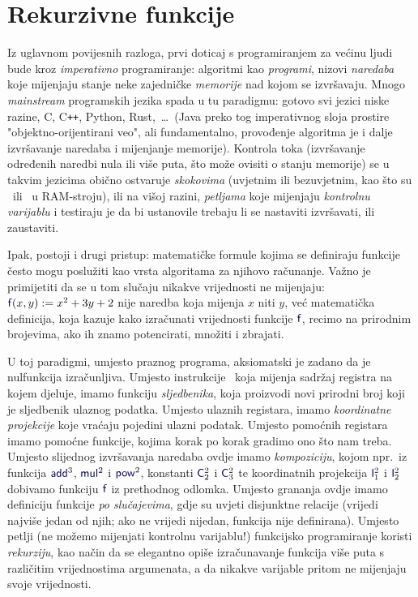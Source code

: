 \chapter{Rekurzivne funkcije}\label{ch:rek}

Iz uglavnom povijesnih razloga, prvi doticaj s programiranjem za većinu ljudi bude kroz \emph{imperativno} programiranje: algoritmi kao \emph{programi}, nizovi \emph{naredaba} koje mijenjaju stanje neke zajedničke \emph{memorije} nad kojom se izvršavaju. Mnogo \emph{mainstream} programskih jezika spada u tu paradigmu: gotovo svi jezici niske razine, C, C\texttt{++}, Python, Rust,~\ldots\ (Java preko tog imperativnog sloja prostire "objektno-orijentirani veo", ali fundamentalno, provođenje algoritma je i dalje izvršavanje naredaba i mijenjanje memorije). Kontrola toka (izvršavanje određenih naredbi nula ili više puta, što može ovisiti o stanju memorije) se u takvim jezicima obično ostvaruje \emph{skokovima} (uvjetnim ili bezuvjetnim, kao što su \dec\ ili \goto\ u RAM-stroju), ili na višoj razini, \emph{petljama} koje mijenjaju \emph{kontrolnu varijablu} i testiraju je da bi ustanovile trebaju li se nastaviti izvršavati, ili zaustaviti.

Ipak, postoji i drugi pristup: matematičke formule kojima se definiraju funkcije često mogu poslužiti kao vrsta algoritama za njihovo računanje. Važno je primijetiti da se u tom slučaju nikakve vrijednosti ne mijenjaju: $\f f(x,y):=x^2+3y+2$ nije naredba koja mijenja $x$ niti $y$, već matematička definicija, koja kazuje kako izračunati vrijednosti funkcije $\f f$, recimo na prirodnim brojevima, ako ih znamo potencirati, množiti i zbrajati.

U toj paradigmi, umjesto praznog programa, aksiomatski je zadano da je nulfunkcija izračunljiva. Umjesto instrukcije \inc\ koja mijenja sadržaj registra na kojem djeluje, imamo funkciju \emph{sljedbenika}, koja proizvodi novi prirodni broj koji je sljedbenik ulaznog podatka. Umjesto ulaznih registara, imamo \emph{koordinatne projekcije} koje vraćaju pojedini ulazni podatak. Umjesto pomoćnih registara imamo pomoćne funkcije, kojima korak po korak gradimo ono što nam treba. Umjesto slijednog izvršavanja naredaba ovdje imamo \emph{kompoziciju}, kojom npr.\ iz funkcija $\f{add}^3$, $\f{mul}^2$ i $\f{pow}^2$, konstanti $\f C_2^2$ i $\f C_3^2$ te koordinatnih projekcija $\f I_1^2$ i $\f I_2^2$ dobivamo funkciju $\f f$ iz prethodnog odlomka. Umjesto grananja ovdje imamo definiciju funkcije \emph{po slučajevima}, gdje su uvjeti disjunktne relacije (vrijedi najviše jedan od njih; ako ne vrijedi nijedan, funkcija nije definirana). Umjesto petlji (ne možemo mijenjati kontrolnu varijablu!) funkcijsko programiranje koristi \emph{rekurziju}, kao način da se elegantno opiše izračunavanje funkcija više puta s različitim vrijednostima argumenata, a da nikakve varijable pritom ne mijenjaju svoje vrijednosti. 

